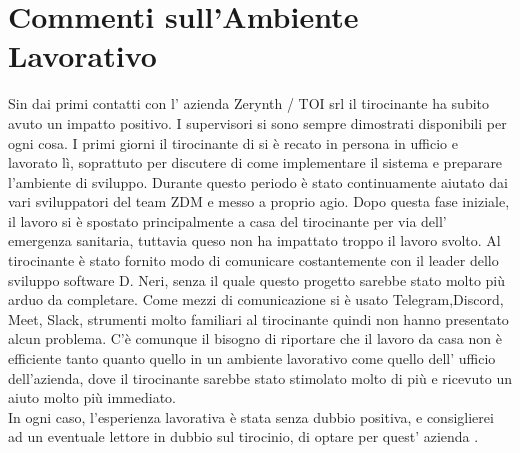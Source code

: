 \documentclass[a4paper,12pt,titlepage,italian,openany]{report}
\begin{document}
\section{Commenti sull'Ambiente Lavorativo}
Sin dai primi contatti con l' azienda Zerynth / TOI srl il tirocinante ha subito avuto un impatto positivo. I supervisori si sono sempre dimostrati disponibili per ogni cosa.
I primi giorni il tirocinante di si è recato in persona in ufficio e lavorato lì, soprattuto per discutere di come implementare il sistema e preparare l'ambiente di sviluppo. Durante questo periodo è stato continuamente aiutato dai vari sviluppatori del team ZDM\cite{zdm:1} e messo a proprio agio.
Dopo questa fase iniziale, il lavoro si è spostato principalmente a casa del tirocinante per via dell' emergenza sanitaria, tuttavia queso non ha impattato troppo il lavoro svolto. Al tirocinante è stato fornito modo di comunicare costantemente con il leader dello sviluppo software D. Neri, senza il quale questo progetto sarebbe stato molto più arduo da completare.
Come mezzi di comunicazione si è usato Telegram,Discord, Meet, Slack, strumenti molto familiari al tirocinante quindi non hanno presentato alcun problema. C'è comunque il bisogno di riportare che il lavoro da casa non è efficiente tanto quanto quello in un ambiente lavorativo come quello dell' ufficio dell'azienda, dove il tirocinante sarebbe stato stimolato molto di più e ricevuto un aiuto molto più immediato. 
\\ In ogni caso, l'esperienza lavorativa è stata senza dubbio positiva, e consiglierei ad un eventuale lettore in dubbio sul tirocinio, di optare per quest' azienda .
\end{document}
